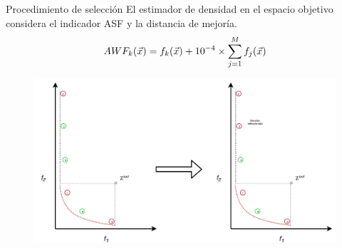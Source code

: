 \documentclass{beamer}
\begin{document}
\begin{frame}{Procedimiento de selección}
El estimador de densidad en el espacio objetivo considera el indicador ASF y la distancia de mejoría.
\begin{equation}\label{eqn:extremes}
\scriptsize
AWF_k (\vec{x}) = f_k(\vec{x}) + 10^{-4} \times  \sum_{j=1}^M f_j( \vec{x} )
\end{equation}

\begin{figure}[H]
\centering
\scriptsize
\includegraphics[scale=0.35]
{Atipico.pdf}
\label{fig:Atipico}
\end{figure}
\end{frame}
\end{document}
